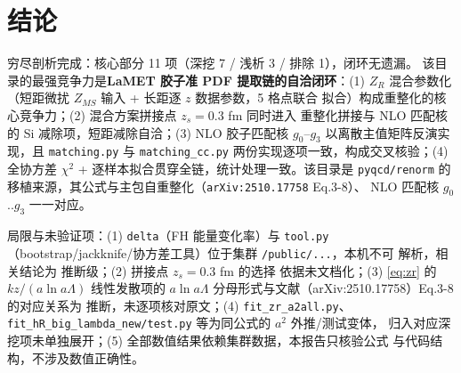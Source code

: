 \documentclass[UTF8]{ctexart}
\begin{document}
\section{结论}

\begin{conclbox}
穷尽剖析完成：核心部分 11 项（深挖 7 / 浅析 3 / 排除 1），闭环无遗漏。
该目录的最强竞争力是\textbf{LaMET 胶子准 PDF 提取链的自洽闭环}：(1)
$Z_R$ 混合参数化（短距微扰 $Z_{MS}$ 输入 + 长距逐 $z$ 数据参数，5 格点联合
拟合）构成重整化的核心竞争力；(2) 混合方案拼接点 $z_s=0.3$ fm 同时进入
重整化拼接与 NLO 匹配核的 Si 减除项，短距减除自洽；(3) NLO 胶子匹配核
$g_0$--$g_3$ 以离散主值矩阵反演实现，且 \texttt{matching.py} 与
\texttt{matching\_cc.py} 两份实现逐项一致，构成交叉核验；(4) 全协方差
$\chi^2$ + 逐样本拟合贯穿全链，统计处理一致。该目录是 \texttt{pyqcd/renorm}
的移植来源，其公式与主包自重整化（\texttt{arXiv:2510.17758} Eq.3-8）、
NLO 匹配核 $g_0$..$g_3$ 一一对应。
\end{conclbox}

\begin{warnbox}
局限与未验证项：(1) \texttt{delta}（FH 能量变化率）与 \texttt{tool.py}
（bootstrap/jackknife/协方差工具）位于集群 \texttt{/public/...}，本机不可
解析，相关结论为 \textcolor{warn}{推断}级；(2) 拼接点 $z_s=0.3$ fm 的选择
依据未文档化；(3) \eqref{eq:zr} 的 $k z/(a\ln a\Lambda)$ 线性发散项的
$a\ln a\Lambda$ 分母形式与文献（arXiv:2510.17758）Eq.3-8 的对应关系为
\textcolor{warn}{推断}，未逐项核对原文；(4) \texttt{fit\_zr\_a2all.py}、
\texttt{fit\_hR\_big\_lambda\_new/test.py} 等为同公式的 $a^2$ 外推/测试变体，
归入对应深挖项未单独展开；(5) 全部数值结果依赖集群数据，本报告只核验公式
与代码结构，不涉及数值正确性。
\end{warnbox}
\end{document}
